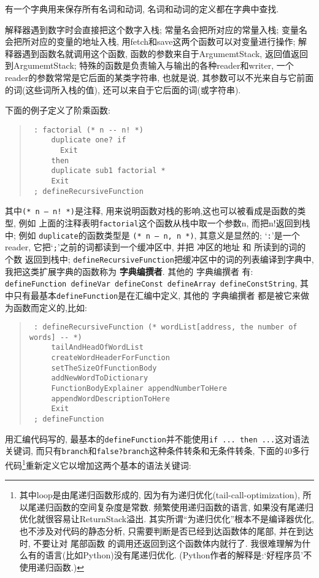 \documentclass[a4paper]{article}
\begin{document}
有一个字典用来保存所有名词和动词,
名词和动词的定义都在字典中查找.

解释器遇到数字时会直接把这个数字入栈;
常量名会把所对应的常量入栈;
变量名会把所对应的变量的地址入栈,
用fetch和save这两个函数可以对变量进行操作;
解释器遇到函数名就调用这个函数,
函数的参数来自于ArgumemtStack,
返回值返回到ArgumemtStack;
特殊的函数是负责输入与输出的各种reader和writer,
一个reader的参数常常是它后面的某类字符串,
也就是说,
其参数可以不光来自与它前面的词(这些词所入栈的值),
还可以来自于它后面的词(或字符串).

下面的例子定义了阶乘函数:

\begin{quote}
\begin{verbatim}
 : factorial (* n -- n! *)
     duplicate one? if
       Exit
     then
     duplicate sub1 factorial *
     Exit
 ; defineRecursiveFunction
\end{verbatim}
\end{quote}
其中\texttt{(* n -- n! *)}是注释,
用来说明函数对栈的影响,这也可以被看成是函数的类型,
例如 上面的注释表明\texttt{factorial}这个函数从栈中取一个参数n,
而把n!返回到栈中;
例如 \texttt{duplicate}的函数类型是 \texttt{(* n -- n, n *)},
其意义是显然的;
`\texttt{:}'是一个reader,
它把`\texttt{;}'之前的词都读到一个缓冲区中,
并把 冲区的地址 和 所读到的词的个数 返回到栈中;
\texttt{defineRecursiveFunction}把缓冲区中的词的列表编译到字典中,
我把这类扩展字典的函数称为 \textbf{字典编撰者}.
其他的 字典编撰者 有: \texttt{defineFunction defineVar defineConst defineArray defineConstString},
其中只有最基本\texttt{defineFunction}是在汇编中定义,
其他的 字典编撰者 都是被它来做为函数而定义的,比如:

\begin{quote}
\begin{verbatim}
 : defineRecursiveFunction (* wordList[address, the number of words] -- *)
     tailAndHeadOfWordList
     createWordHeaderForFunction
     setTheSizeOfFunctionBody
     addNewWordToDictionary
     FunctionBodyExplainer appendNumberToHere
     appendWordDescriptionToHere
     Exit
 ; defineFunction
\end{verbatim}
\end{quote}

用汇编代码写的,
最基本的\texttt{defineFunction}并不能使用\texttt{if ...  then ...}这对语法关键词,
而只有\texttt{branch}和\texttt{false?branch}这种条件转条和无条件转条,
下面的40多行代码\footnote{其中loop是由尾递归函数形成的,
因为有为递归优化(tail-call-optimization),
所以尾递归函数的空间复杂度是常数.
频繁使用递归函数的语言,
如果没有尾递归优化就很容易让ReturnStack溢出.
其实所谓``为递归优化''根本不是编译器优化,
也不涉及对代码的静态分析,
只需要判断是否已经到达函数体的尾部,
并在到达时,
不要让对 尾部函数 的调用还返回到这个函数体内就行了.
我很难理解为什么有的语言(比如Python)没有尾递归优化.
(Python作者的解释是:`好程序员'不使用递归函数.)}重新定义它以增加这两个基本的语法关键词:
\end{document}
